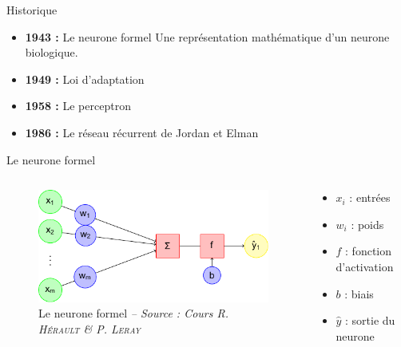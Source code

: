 \begin{frame}{Historique}
	\begin{itemize}
		\item \textbf{1943 :} Le neurone formel \cite{McCulloch43}
		\newline Une représentation mathématique d’un neurone biologique.
		\item \textbf{1949 :} Loi d'adaptation \cite{Hebb49}
		\item \textbf{1958 :} Le perceptron \cite{Rosenblatt58}
		\item \textbf{1986 :} Le réseau récurrent de Jordan et Elman \cite{Jordan86}
	\end{itemize}
\end{frame}

\begin{frame}{Le neurone formel}
    
    \begin{columns}
        \begin{column}{.55\textwidth}
            \begin{figure}
                \includegraphics[height=.75\textheight,width=\textwidth,keepaspectratio]{images/neurone}
                \caption{Le neurone formel {\scriptsize\it -- Source : Cours R. \textsc{Hérault} \& P. \textsc{Leray}}}
            \end{figure}
        \end{column}
        \begin{column}{.45\textwidth}
    
            \begin{itemize}
                \item $x_i$ : entrées
                \item $w_i$ : poids
                \item $f$ : fonction d'activation
                \item $b$ : biais
                \item $\hat{y}$ : sortie du neurone
            \end{itemize}
        \end{column}
    \end{columns}
\end{frame}
